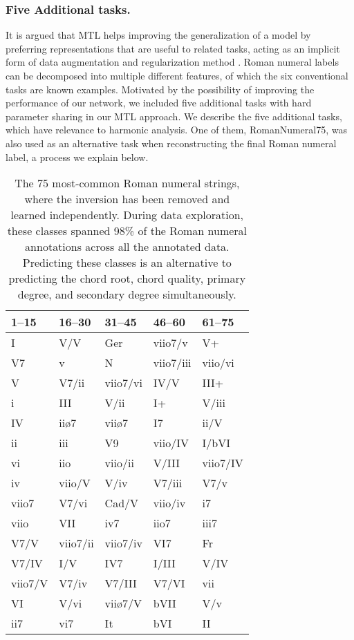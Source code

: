 \documentclass{article}
\begin{document}
\subsubsection{Five Additional tasks.}\label{sec:additionaltasks}

It is argued that MTL helps improving the generalization of a model by preferring representations that are useful to related tasks, acting as an implicit form of data augmentation and regularization method \cite{ruder_overview_2017}.
Roman numeral labels can be decomposed into multiple different features, of which the six conventional tasks are known examples.
Motivated by the possibility of improving the performance of our network, we included five additional tasks with hard parameter sharing in our MTL approach.
We describe the five additional tasks, which have relevance to harmonic analysis. 
One of them, RomanNumeral75, was also used as an alternative task when reconstructing the final Roman numeral label, a process we explain below.

\begin{table}[]
\begin{tabular}{l|l|l|l|l}
1--15    & 16--30    & 31--45    & 46--60     & 61--75    \\
\hline
I       & V/V      & Ger     & viio7/v   & V+       \\
V7      & v        & N        & viio7/iii & viio/vi  \\
V       & V7/ii    & viio7/vi & IV/V      & III+     \\
i       & III      & V/ii     & I+        & V/iii    \\
IV      & iiø7     & viiø7    & I7        & ii/V     \\
ii      & iii      & V9       & viio/IV   & I/bVI    \\
vi      & iio      & viio/ii  & V/III     & viio7/IV \\
iv      & viio/V   & V/iv     & V7/iii    & V7/v     \\
viio7   & V7/vi    & Cad/V    & viio/iv   & i7       \\
viio    & VII      & iv7      & iio7      & iii7     \\
V7/V    & viio7/ii & viio7/iv & VI7       & Fr      \\
V7/IV   & I/V      & IV7      & I/III     & V/IV     \\
viio7/V & V7/iv    & V7/III   & V7/VI     & vii      \\
VI      & V/vi     & viiø7/V  & bVII      & V/v      \\
ii7     & vi7      & It       & bVI       & II      
\end{tabular}
\caption{The 75 most-common Roman numeral strings, where the inversion has been removed and learned independently. During data exploration, these classes spanned 98\% of the Roman numeral annotations across all the annotated data. Predicting these classes is an alternative to predicting the chord root, chord quality, primary degree, and secondary degree simultaneously.}
\label{tab:top75rn}
\end{table}
\end{document}
